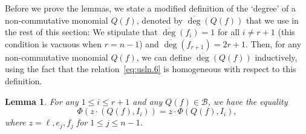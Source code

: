 \documentclass{amsart}
\numberwithin{equation}{section}
\theoremstyle{theorem}
\newtheorem{lemma}[theorem]{Lemma}
\theoremstyle{definition}
\newcommand{\ol}{\overline}
\begin{document}
Before we prove the lemmas, we state a modified definition of the `degree' of a non-commutative monomial $Q(f)$, denoted by $\ol{\deg}(Q(f))$ that we use in the rest of this section: We stipulate that $\ol\deg(f_i)=1$ for all $i\neq r+1$ (this condition is vacuous when $r=n-1$) and $\ol\deg(f_{r+1})=2r+1$. Then, for any non-commutative monomial $Q(f)$, we can define $\ol{\deg}(Q(f))$ inductively, using the fact that the relation~\eqref{eq:usln.6} is homogeneous with respect to this definition.

\begin{lemma} \label{lem:I_r+1}
For any $1\leq i\leq r+1$ and any $Q(f)\in \mathcal B$, we have the equality
\[\Phi(z\cdot(Q(f), I_i)) = z\cdot \Phi(Q(f), I_i),\] where $z=\ell,e_j,f_j$ %
for $1\leq j\leq n-1$.
\end{lemma}
\end{document}
